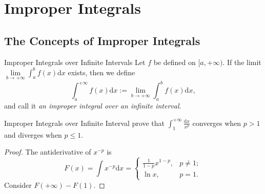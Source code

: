 \section{Improper Integrals}

\subsection{The Concepts of Improper Integrals}

\begin{definition}{Improper Integrals over Infinite Intervals}{}
  Let $f$ be defined on $[a, +\infty)$.
  If the limit $\lim \limits _{b \rightarrow +\infty} \int_a^b f(x)\mathrm{d} x$
  exists,
  then we define
  \begin{equation}
    \int_a^{+\infty} f(x) \mathrm{d} x := \lim \limits _{b \rightarrow +\infty} \int_a^b f(x)\mathrm{d} x,
  \end{equation}
  and call it \emph{an improper integral over an infinite interval}.
\end{definition}

\begin{example}{Improper Integrals over Infinite Interval}{}
  prove that $\int_1^{+\infty} \frac{\mathrm{d}x}{x^p}$ converges when $p > 1$
  and diverges when $p \leq 1$.
\end{example}

\begin{proof}
  The antiderivative of $x^{-p}$ is
  \begin{equation}
    F(x) = \int x^{-p}\mathrm{d} x =
    \begin{cases}
      \frac{1}{1-p} x^{1-p}, & p \neq 1;\\
      \ln x, & p =1.
    \end{cases}
  \end{equation}
  Consider $F(+\infty) - F(1)$.
\end{proof}

